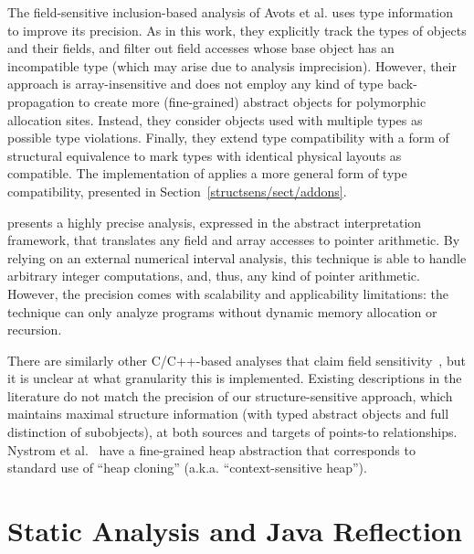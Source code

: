 The field-sensitive inclusion-based analysis of Avots et
al. \cite{icse/AvotsDLL05} uses type information to improve its
precision. As in this work, they explicitly track the types of objects
and their fields, and filter out field accesses whose base object has
an incompatible type (which may arise due to analysis
imprecision). However, their approach is array-insensitive and does
not employ any kind of type back-propagation to create more
(fine-grained) abstract objects for polymorphic allocation
sites. Instead, they consider objects used with multiple types as
possible type violations. Finally, they extend type compatibility with
a form of structural equivalence to mark types with identical physical
layouts as compatible. The implementation of \cclyzer{} applies a more
general form of type compatibility, presented in
Section~\ref{structsens/sect/addons}.

\citeauthor{lctrts/Mine06} \cite{lctrts/Mine06} presents a highly
precise analysis, expressed in the abstract interpretation framework,
that translates any field and array accesses to pointer arithmetic. By
relying on an external numerical interval analysis, this technique is
able to handle arbitrary integer computations, and, thus, any kind of
pointer arithmetic. However, the precision comes with scalability and
applicability limitations: the technique can only analyze programs
without dynamic memory allocation or recursion.

There are similarly other C/C++-based analyses that claim
field sensitivity~\cite{popl/HardekopfL09,cgo/HardekopfL11}, but it is
unclear at what granularity this is implemented. Existing descriptions
in the literature do not match the precision of our
structure-sensitive approach, which maintains maximal structure
information (with typed abstract objects and full distinction of subobjects), at
both sources and targets of points-to relationships. Nystrom et
al.~\cite{paste/NystromKH04} have a fine-grained heap abstraction that
corresponds to standard use of ``heap cloning''
(a.k.a. ``context-sensitive heap'').%


\section{Static Analysis and Java Reflection}
\label{related:sect/reflection}

